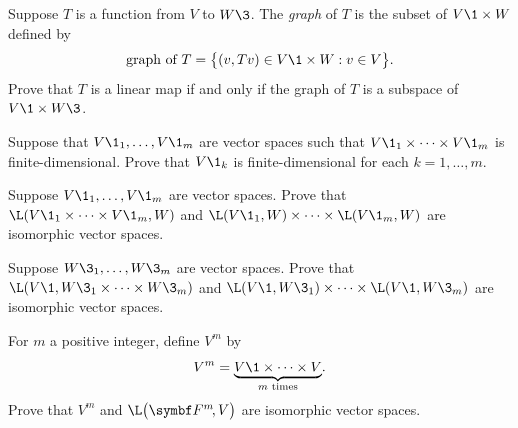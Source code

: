 \begin{exercises}

\exercise
Suppose $T$ is a function from $V$ to $W\3$. The \emph{graph} of $T$ is the subset of
$V\1 \times W$ defined by
\[
\text{graph of}\ T = \br[\big]{ (v, Tv) \in V\1 \times W: v \in V }.
\]
Prove that $T$ is a linear map if and only if the graph of $T$
is a subspace of $V\1 \times W\3$.


\exercise
Suppose that $V\1_1, \dots, V\1_m$ are vector spaces such that $V\1_1 \times \dots \times V\1_m$ is finite-dimensional. Prove that $V\1_k$ is finite-dimensional for each $k = 1, \dots, m$.

\exercise
Suppose $V\1_1, \dots, V\1_m$ are vector spaces. Prove that $\L(V\1_1 \times \dots \times V\1_m, W)$ and $\L(V\1_1, W) \times \dots \times \L(V\1_m, W)$ are isomorphic vector spaces.



\exercise
Suppose $W\3_1, \dots, W\3_m$ are vector spaces. Prove that $\L(V\1, W\3_1 \times \dots \times W\3_m)$ and
$\L(V\1, W\3_1) \times \dots \times \L(V\1, W\3_m)$ are isomorphic vector spaces.


\exercise
For $m$ a positive integer, define $V^m$ by
\[
V^m = \underbrace{V\1 \times \dots \times V}_{m \text{\ times}}\!.
\]
Prove that $V^m$ and $\L\paren[\big]{\FF{m}, V}$ are isomorphic vector spaces.



\end{exercises}
